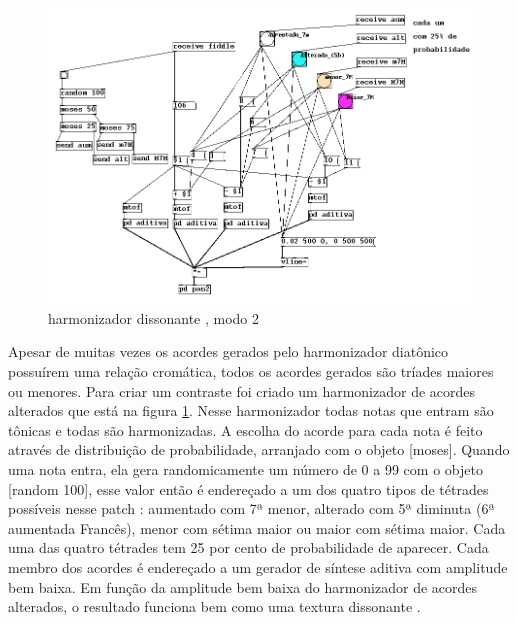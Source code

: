 \documentclass{ppgmus}
\begin{document}
\begin{figure}
\includegraphics[scale=.5]{harm4}
\caption{harmonizador dissonante , modo 2}
\label{harm4}
\end{figure}

Apesar de muitas vezes os acordes gerados pelo harmonizador diatônico possuírem uma relação 
cromática, todos os acordes gerados são tríades maiores ou menores. Para criar um contraste 
foi criado um harmonizador de acordes alterados que está na figura \ref{harm4}. Nesse harmonizador todas notas 
que entram são tônicas e todas são harmonizadas. 
	A escolha do acorde para cada nota é feito através de distribuição de probabilidade, 
arranjado com o objeto [moses]. Quando uma nota entra, ela gera randomicamente um número de 0 
a 99 com o objeto [random 100], esse valor então é endereçado a um dos quatro tipos de tétrades 
possíveis nesse patch : aumentado com 7ª menor, alterado com 5ª diminuta (6ª aumentada Francês), 
menor com sétima maior ou maior com sétima maior. Cada uma das quatro tétrades tem 25 por cento 
de probabilidade de aparecer. Cada membro dos acordes é endereçado a um gerador de síntese aditiva 
com amplitude bem baixa. Em função da amplitude bem baixa do harmonizador de acordes alterados, o 
resultado funciona bem como uma textura dissonante .


\end{document}
